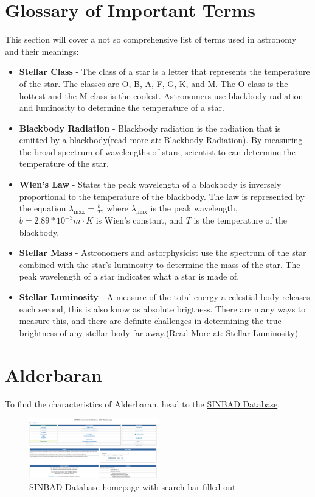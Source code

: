 \documentclass[Journal]{article}
\begin{document}
\section{Glossary of Important Terms}
This section will cover a not so comprehensive list of terms used in astronomy and their meanings:
\begin{itemize}
    \item \textbf{Stellar Class} - The class of a star is a letter that represents the temperature of the star. The classes are O, B, A, F, G, K, and M. The O class is the hottest and the M class is the coolest. Astronomers use blackbody radiation and luminosity to determine the temperature of a star.
    \item  \textbf{Blackbody Radiation} - Blackbody radiation is the radiation that is emitted by a blackbody(read more at: \href{https://phys.libretexts.org/Bookshelves/University_Physics/University_Physics_(OpenStax)/University_Physics_III_-_Optics_and_Modern_Physics_(OpenStax)/06%3A_Photons_and_Matter_Waves/6.02%3A_Blackbody_Radiation}{Blackbody Radiation}). By measuring the broad spectrum of wavelengths of stars, scientist to can determine the temperature of the star.
    \item \textbf{Wien's Law} - States the peak wavelength of a blackbody is inversely proportional to the temperature of the blackbody. The law is represented by the equation $\lambda_{\text{max}} = \frac{b}{T}$, where $\lambda_{\text{max}}$ is the peak wavelength, $b=2.89*10^{-3} m \cdot K$ is Wien's constant, and $T$ is the temperature of the blackbody.
    \item \textbf{Stellar Mass} - Astronomers and astorphysicist use the spectrum of the star combined with the star's luminosity to determine the mass of the star. The peak wavelength of a star indicates what a star is made of. 
    \item \textbf{Stellar Luminosity} - A measure of the total energy a celestial body releases each second, this is also know as absolute brigtness. There are many ways to measure this, and there are definite challenges in determining the true brightness of any stellar body far away.(Read More at: \href{https://www.teachastronomy.com/textbook/Properties-of-Stars/Stellar-Luminosity/}{Stellar Luminosity})
\end{itemize}

\section{Alderbaran}
To find the characteristics of Alderbaran, head to the \href{https://simbad.cds.unistra.fr/simbad/}{SINBAD Database}. 
\begin{figure}[H]
    \centering
    \includegraphics[width=0.5\textwidth]{SINBAD1.png}
    \caption{SINBAD Database homepage with search bar filled out.} 
    \label{fig:Alderbaran}
\end{figure}
\end{document}
